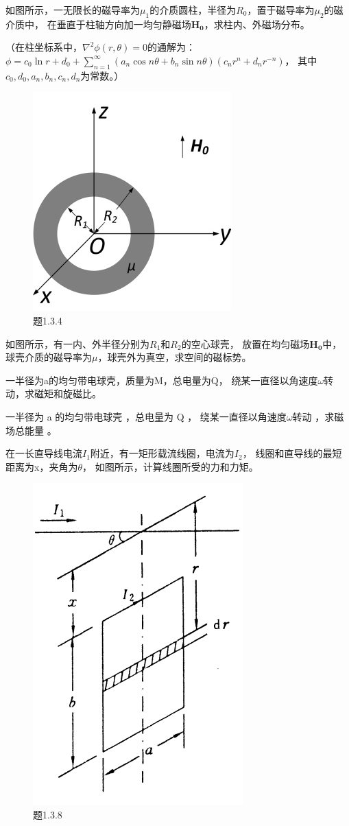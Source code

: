\begin{question}
如图所示，一无限长的磁导率为$\mu_1$的介质圆柱，半径为$R_0$，置于磁导率为$\mu_2$的磁介质中，
在垂直于柱轴方向加一均匀静磁场$\mathbf{H_0}$，求柱内、外磁场分布。

\noindent（在柱坐标系中，$\nabla^2 \phi(r,\theta)=0$的通解为： 
$\phi=c_0 \ln r+d_0+\sum_{n=1}^{\infty}(a_n \cos n\theta+b_n \sin n\theta)(c_nr^n+d_nr^{-n})$，
其中$c_0,d_0,a_n,b_n,c_n,d_n$为常数。）
\begin{figure}[ht]
	\centering
	\includegraphics[height=3 cm]{images/q3_2.jpg}
	\caption{题1.3.4}
\end{figure}
\end{question}

\begin{question}
如图所示，有一内、外半径分别为$R_1$和$R_2$的空心球壳，
放置在均匀磁场$\mathbf{H_0}$中，
球壳介质的磁导率为$\mu$，球壳外为真空，求空间的磁标势。
\end{question}


\begin{question}
	一半径为a的均匀带电球壳，质量为M，总电量为Q，
	绕某一直径以角速度$\omega$转动，求磁矩和旋磁比。
\end{question}

\begin{question}
一半径为 a 的均匀带电球壳 ，总电量为 Q ，
绕某一直径以角速度$\omega$转动 ，求磁场总能量 。
\end{question}

\begin{question}
在一长直导线电流$I_1$附近，有一矩形载流线圈，电流为$I_2$，
线圈和直导线的最短距离为x，夹角为$\theta$，
如图所示，计算线圈所受的力和力矩。
\begin{figure}[ht]
	\centering
	\includegraphics[height=3 cm]{images/q3_3.png}
	\caption{题1.3.8}
\end{figure}
\end{question}